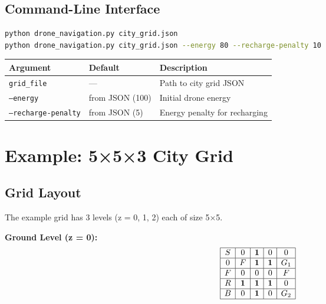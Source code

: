 \documentclass[12pt]{article}
\begin{document}
\subsection{Command-Line Interface}

\begin{lstlisting}[language=bash,caption={Usage.}]
python drone_navigation.py city_grid.json
python drone_navigation.py city_grid.json --energy 80 --recharge-penalty 10
\end{lstlisting}

\begin{center}
\begin{tabular}{@{} l l l @{}}
\toprule
\textbf{Argument}          & \textbf{Default}     & \textbf{Description} \\
\midrule
\texttt{grid\_file}         & —                    & Path to city grid JSON \\
\texttt{--energy}           & from JSON (100)      & Initial drone energy \\
\texttt{--recharge-penalty} & from JSON (5)        & Energy penalty for recharging \\
\bottomrule
\end{tabular}
\end{center}

\section{Example: 5×5×3 City Grid}

\subsection{Grid Layout}

The example grid has 3 levels (z = 0, 1, 2) each of size 5×5.

\textbf{Ground Level (z = 0):}
\[
\begin{array}{|c|c|c|c|c|}
\hline
S  & 0  & \mathbf{1} & 0  & 0 \\
\hline
0  & F  & \mathbf{1} & \mathbf{1} & G_1 \\
\hline
F  & 0  & 0  & 0  & F \\
\hline
R  & \mathbf{1} & \mathbf{1} & \mathbf{1} & 0 \\
\hline
B  & 0  & \mathbf{1} & 0  & G_2 \\
\hline
\end{array}
\]
\end{document}
